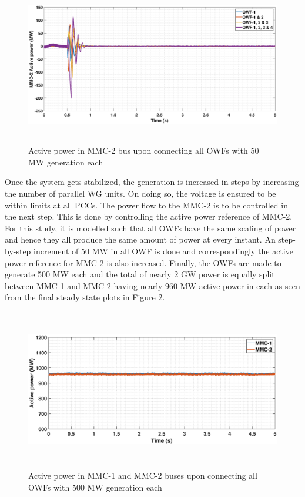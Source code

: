\begin{figure}[H]
    \includegraphics[height = 7cm,width = \textwidth]{Diagrams/Chapter_5/P_MMC_2_WT1234connect_2.eps}
    \caption{Active power in MMC-2 bus upon connecting all OWFs with 50 MW generation each}
    \label{P_MMC_2_WT1234connect}
\end{figure}

Once the system gets stabilized, the generation is increased in steps by increasing the number of parallel \gls{WG} units. On doing so, the voltage is ensured to be within limits at all \gls{PCC}s. The power flow to the \gls{MMC}-2 is to be controlled in the next step. This is done by controlling the active power reference of \gls{MMC}-2. For this study, it is modelled such that all \gls{OWF}s have the same scaling of power and hence they all produce the same amount of power at every instant. An step-by-step increment of 50 MW in all \gls{OWF} is done and correspondingly the active power reference for \gls{MMC}-2 is also increased. Finally, the \gls{OWF}s are made to generate 500 MW each and the total of nearly 2 GW power is equally split between \gls{MMC}-1 and \gls{MMC}-2 having nearly 960 MW active power in each as seen from the final steady state plots in Figure \ref{P_MMC_1_2_All_WTconnect}.

\begin{figure}[H]
\centering
    \includegraphics[height = 7cm,width = \textwidth]{Diagrams/Chapter_5/P_MMC_1_2_All_WTconnect.eps}
    \caption{Active power in MMC-1 and MMC-2 buses upon connecting all OWFs with 500 MW generation each}
    \label{P_MMC_1_2_All_WTconnect}
\end{figure}

